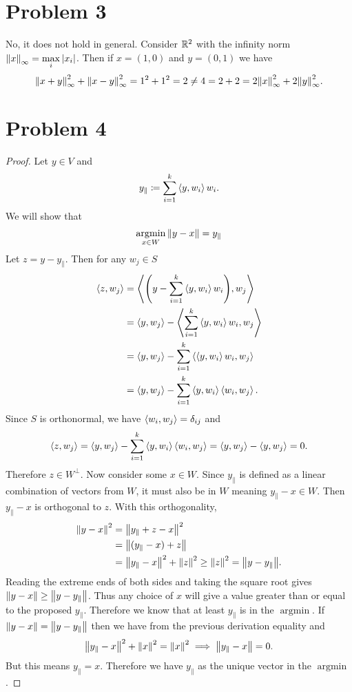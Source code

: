 \documentclass{article}
\DeclareMathOperator*{\argmin}{argmin}
\begin{document}
\section*{Problem 3}
No, it does not hold in general. Consider $\mathbb{R}^2$ with the infinity norm $\norm{x}_{\infty} = \displaystyle\max_i |x_i|$. Then if $x = (1,0)$ and $y = (0, 1)$ we have
\[
    \norm{x + y}_{\infty}^2 + \norm{x - y}_{\infty}^2 = 1^2 + 1^2 = 2 \neq 4 = 2 + 2 = 2 \norm{x}_{\infty}^2 + 2 \norm{y}_{\infty}^2
.\]

\section*{Problem 4}
\begin{proof}
    Let $y \in V$ and
    \[
        y_{\parallel} \coloneq \sum_{i=1}^k \iprd{y, w_i} w_i
    .\]
    We will show that
    \[
        \argmin_{x \in W} \norm{y - x} = y_\parallel
    \]
    Let $z = y - y_{\parallel}$. Then for any $w_j \in S$
    \begin{align*}
        \iprd{z, w_j} &= \iprd{\qty(y - \sum_{i=1}^k \iprd{y, w_i} w_i), w_j} \\
                      &= \iprd{y, w_j} - \iprd{\sum_{i=1}^k \iprd{y, w_i} w_i, w_j} \\
                      &= \iprd{y, w_j} - \sum_{i=1}^k \iprd{\iprd{y, w_i} w_i, w_j} \\
                      &= \iprd{y, w_j} - \sum_{i=1}^k \iprd{y, w_i} \iprd{w_i, w_j}.
    \end{align*}
    Since $S$ is orthonormal, we have $\iprd{w_i, w_j} = \delta_{ij}$ and
    \[
        \iprd{z, w_j} = \iprd{y, w_j} - \sum_{i=1}^k \iprd{y, w_i} \iprd{w_i, w_j} = \iprd{y, w_j} - \iprd{y, w_j} = 0
    .\]
    Therefore $z \in W^\perp$. Now consider some $x \in W$. Since $y_{\parallel}$ is defined as a linear combination of vectors from $W$, it must also be in $W$ meaning $y_\parallel - x \in W$. Then $y_{\parallel} - x$ is orthogonal to $z$. With this orthogonality,
    \begin{align*}
        \norm{y - x}^2 &= \norm{y_{\parallel} + z - x}^2 \\
                       &= \norm{(y_{\parallel} - x) + z} \\
                       &= \norm{y_{\parallel} - x}^2 + \norm{z}^2 \geq \norm{z}^2 = \norm{y - y_{\parallel}}.
    \end{align*}
    Reading the extreme ends of both sides and taking the square root gives $\norm{y-x} \geq \norm{y - y_\parallel}$. Thus any choice of $x$ will give a value greater than or equal to the proposed $y_{\parallel}$. Therefore we know that at least $y_\parallel$ is in the $\argmin$. If $\norm{y-x} = \norm{y-y_{\parallel}}$ then we have from the previous derivation equality and
    \[
        \norm{y_{\parallel} - x}^2 + \norm{x}^2 = \norm{x}^2 \implies \norm{y_\parallel - x} = 0
    .\]
    But this means $y_{\parallel} = x$. Therefore we have $y_\parallel$ as the unique vector in the $\argmin$.
\end{proof}
\end{document}
